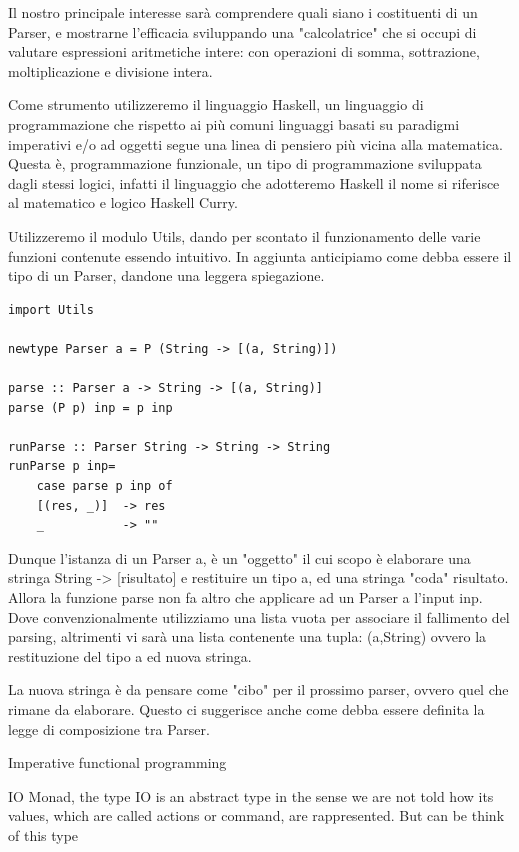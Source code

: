 \documentclass[a4papert]{article}
\begin{document}
Il nostro principale interesse sarà comprendere quali siano i costituenti di un Parser, e mostrarne l'efficacia sviluppando una "calcolatrice" che si occupi di valutare espressioni aritmetiche intere: con operazioni di somma, sottrazione, moltiplicazione e divisione intera.

Come strumento utilizzeremo il linguaggio Haskell, un linguaggio di programmazione che rispetto ai più comuni linguaggi basati su paradigmi imperativi e/o ad oggetti segue una linea di pensiero più vicina alla matematica. Questa è, programmazione funzionale, un tipo di programmazione sviluppata dagli stessi logici, infatti il linguaggio che adotteremo Haskell il nome si riferisce al matematico e logico Haskell Curry.


Utilizzeremo il modulo Utils, dando per scontato il funzionamento delle varie funzioni contenute essendo intuitivo. In aggiunta anticipiamo come debba essere il tipo di un Parser, dandone una leggera spiegazione.

\begin{lstlisting}[style=haskellstyle]
import Utils

newtype Parser a = P (String -> [(a, String)])

parse :: Parser a -> String -> [(a, String)]
parse (P p) inp = p inp

runParse :: Parser String -> String -> String
runParse p inp=
    case parse p inp of
    [(res, _)]  -> res
    _           -> ""

\end{lstlisting}
Dunque l'istanza di un Parser a, è un "oggetto" il cui scopo è elaborare una stringa String -> [risultato] e restituire un tipo a, ed una stringa "coda" risultato. Allora la funzione parse non fa altro che applicare ad un Parser a l'input inp. Dove convenzionalmente utilizziamo una lista vuota per associare il fallimento del parsing, altrimenti vi sarà una lista contenente una tupla: (a,String) ovvero la restituzione del tipo a ed nuova stringa.

La nuova stringa è da pensare come "cibo" per il prossimo parser, ovvero quel che rimane da elaborare. Questo ci suggerisce anche come debba essere definita la legge di composizione tra Parser.


Imperative functional programming


IO Monad, the type IO is an abstract type in the sense we are not told how its values, which are called actions or command, are rappresented. But can be think of this type
\end{document}

